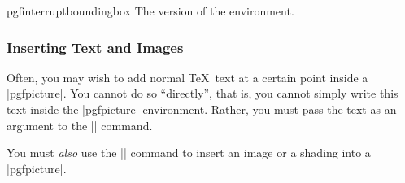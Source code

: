 \begin{contextenvironment}{{pgfinterruptboundingbox}}
    The  version of the environment.
\end{contextenvironment}


\subsubsection{Inserting Text and Images}
\label{section-text-command}

Often, you may wish to add normal \TeX\ text at a certain point inside a
|{pgfpicture}|. You cannot do so ``directly'', that is, you cannot simply write
this text inside the |{pgfpicture}| environment. Rather, you must pass the text
as an argument to the |\pgftext| command.

You must \emph{also} use the |\pgftext| command to insert an image or a shading
into a |{pgfpicture}|.

